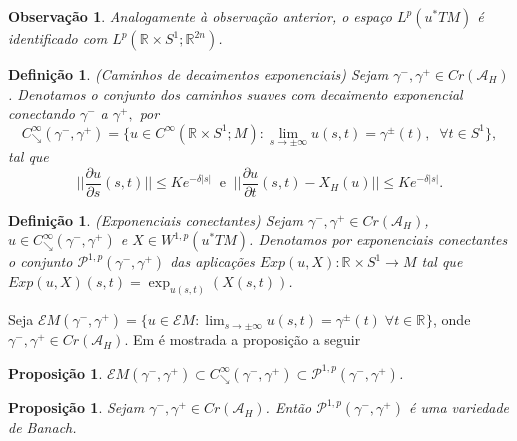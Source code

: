 \documentclass[12pt]{book}
\newtheorem{definicao}[teorema]{Definição}
\newtheorem{observacao}[teorema]{Observação}
\newtheorem{proposicao}[teorema]{Proposição}
\newcommand{\aplicacaoexponencial}[2]{\exp_{#1}(#2)}
\newcommand{\aplicaoessuavesreatacirculo}{C^{\infty}(\retacartesianocirculo; M)}
\newcommand{\caminhosdecaimentoexponencial}[2]{C^{\infty}_{\searrow}(#1, #2)}
\newcommand{\caminhosdecaimentoexponencialpadrao}{\caminhosdecaimentoexponencial{\gamma^{-}}{\gamma^{+}}}
\newcommand{\caminhosexponenciaisconectantes}[2]{\mathcal{P}^{1,p}(#1, #2)}
\newcommand{\caminhosexponenciaisconectantespadrao}{\caminhosexponenciaisconectantes{\gamma^{-}}{\gamma^{+}}}
\newcommand{\circulo}{S^{1}}
\newcommand{\derivadaparcial}[2]{\frac{\partial #1}{\partial #2}}
\newcommand{\energiafinitaM}{\mathcal{E}M}
\newcommand{\energiafinitaMconectante}{\energiafinitaM(\gamma^{-}, \gamma^{+})}
\newcommand{\espacoLp}[1]{L^{p}(#1)}
\newcommand{\espacoLpcontradominio}[2]{L^{p}(#1;#2)}
\newcommand{\espacosobolev}[1]{W^{1,p}(#1)}
\newcommand{\funcionalH}{\mathcal{A}_{H}}
\newcommand{\normagrande}[1]{\Big|\Big|#1\Big|\Big|}
\newcommand{\pontoscriticos}[1]{\textit{Cr}(#1)}
\newcommand{\pullbackfibradotangente}[2]{#1^{*}T#2}
\newcommand{\pullbackfibradotangenteM}[1]{\pullbackfibradotangente{#1}{M}}
\newcommand{\retacartesianocirculo}{\real{} \times \circulo}
\newcommand{\real}[1]{\mathbb{R}^{#1}}
\newcommand{\reta}{\real{}}
\begin{document}
	\begin{observacao}\label{observacao_identificacao_espaco_Lp}
		Analogamente à observação anterior, o espaço $\espacoLp{\pullbackfibradotangenteM{u}}$ é identificado com $\espacoLpcontradominio{\retacartesianocirculo}{\real{2n}}$.
	\end{observacao}
	
	\begin{definicao}\label{definicao_caminhos_decaimentos_exponenciais}
		(Caminhos de decaimentos exponenciais) Sejam $\gamma^{-}, \gamma^{+} \in \pontoscriticos{\funcionalH}$. Denotamos o conjunto dos caminhos suaves com decaimento exponencial conectando $\gamma^{-}$ a $\gamma^{+}, $ por
		$$
		\caminhosdecaimentoexponencialpadrao = \{u \in \aplicaoessuavesreatacirculo: \lim_{s \to \pm \infty} u(s,t) = \gamma^{\pm}(t),\;\;\forall t\in \circulo \},
		$$
		tal que
		$$
		\normagrande{\derivadaparcial{u}{s}(s,t)} \leq Ke^{-\delta|s|} \;\; \text{e} \;\; \normagrande{\derivadaparcial{u}{t}(s,t) -X_{H}(u)} \leq Ke^{-\delta|s|}.
		$$
	\end{definicao}
	
	\begin{definicao}
		(Exponenciais conectantes) Sejam $\gamma^{-}, \gamma^{+} \in \pontoscriticos{\funcionalH}$, $u \in \caminhosdecaimentoexponencialpadrao$ e $X \in \espacosobolev{\pullbackfibradotangenteM{u}}$. Denotamos por exponenciais conectantes  o conjunto $\caminhosexponenciaisconectantespadrao$ das aplicações $Exp(u,X):\retacartesianocirculo \to M$ tal que $Exp(u,X)(s,t) = \aplicacaoexponencial{u(s,t)}{X(s,t)}$.
	\end{definicao}
	
	Seja $\energiafinitaMconectante =\{u\in \energiafinitaM: \lim_{s\to \pm \infty}u(s,t) =\gamma^{\pm}(t)\; \forall t\in \reta \}$, onde $\gamma^{-}, \gamma^{+} \in \pontoscriticos{\funcionalH}$.
	Em \cite{audi_floer_homology} é mostrada a proposição a seguir
	
	\begin{proposicao}
		$\energiafinitaMconectante \subset \caminhosdecaimentoexponencialpadrao \subset  \caminhosexponenciaisconectantespadrao$.
	\end{proposicao}
	
	
	\begin{proposicao}\label{proposicao_variedade_banach}
		Sejam $\gamma^{-}, \gamma^{+} \in \pontoscriticos{\funcionalH}$. Então $\caminhosexponenciaisconectantespadrao$ é uma variedade de Banach.
	\end{proposicao}
	
\end{document}
